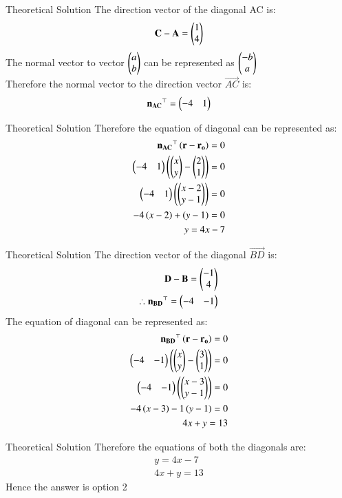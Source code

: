 \documentclass{beamer}
\begin{document}
\begin{frame}{Theoretical Solution}
The direction vector of the diagonal AC is:
\begin{align}
    \mathbf{C}-\mathbf{A}=\begin{pmatrix}1\\4\end{pmatrix}
\end{align}
The normal vector to vector $\begin{pmatrix}a\\b\end{pmatrix}$ can be represented as $\begin{pmatrix}-b\\a\end{pmatrix}$\\
Therefore the normal vector to the direction vector $\vec{AC}$ is:
\begin{align}
    \mathbf{n_{AC}}^{\top}=\begin{pmatrix}-4&1\end{pmatrix}
\end{align}
\end{frame}
\begin{frame}{Theoretical Solution}
Therefore the equation of diagonal can be represented as:
\begin{align}
    \mathbf{n_{AC}}^{\top}\left(\mathbf{r}-\mathbf{r_o}\right)=0\\
    \begin{pmatrix}-4&1\end{pmatrix}\left(\begin{pmatrix}x\\y\end{pmatrix}-\begin{pmatrix}2\\1\end{pmatrix}\right)=0\\
    \begin{pmatrix}-4&1\end{pmatrix}\left(\begin{pmatrix}x-2\\y-1\end{pmatrix}\right)=0\\
    -4\left(x-2\right)+\left(y-1\right)=0\\
    y=4x-7
\end{align}
\end{frame}
\begin{frame}{Theoretical Solution}
The direction vector of the diagonal $\vec{BD}$ is:
\begin{align}
    \mathbf{D}-\mathbf{B}=\begin{pmatrix}-1\\4\end{pmatrix}\\
    \therefore \mathbf{n_{BD}}^{\top}=\begin{pmatrix}-4&-1\end{pmatrix}
\end{align}
The equation of diagonal can be represented as:
\begin{align}
        \mathbf{n_{BD}}^{\top}\left(\mathbf{r}-\mathbf{r_o}\right)=0\\
        \begin{pmatrix}-4&-1\end{pmatrix}\left(\begin{pmatrix}x\\y\end{pmatrix}-\begin{pmatrix}3\\1\end{pmatrix}\right)=0\\
        \begin{pmatrix}-4&-1\end{pmatrix}\left(\begin{pmatrix}x-3\\y-1\end{pmatrix}\right)=0\\
        -4\left(x-3\right)-1\left(y-1\right)=0\\
        4x+y=13
\end{align}
\end{frame}
\begin{frame}{Theoretical Solution}
Therefore the equations of both the diagonals are:
\begin{align}
    y=4x-7\\4x+y=13
\end{align}
Hence the answer is option 2
\end{frame}
\end{document}
